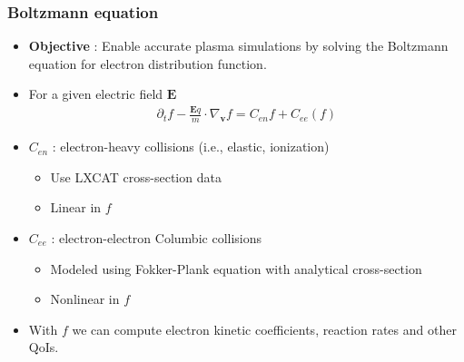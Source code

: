 \documentclass[mathserif, aspectratio=169]{beamer}
\newcommand{\vect}[1]{\boldsymbol{#1}}
\newcommand{\myint}{\int\limits}
\newcommand{\diff}[1]{\, d#1}
\begin{document}
\begin{frame}
	\frametitle{Boltzmann equation}
	\begin{itemize}
		\item \textbf{Objective} : Enable accurate plasma simulations by solving the Boltzmann equation for electron distribution function.
		\item For a given electric field $\vect{E}$
		\begin{align}
			\partial_t f -\frac{\vect{E} q}{m} \cdot \nabla_{\vect{v }}f = C_{en}f + C_{ee}(f)
		\end{align}
		\item $C_{en}$ : electron-heavy collisions (i.e., elastic, ionization)
		\begin{itemize}
			\item Use LXCAT cross-section data 
			\item Linear in $f$
		\end{itemize} 
		\item $C_{ee}$ : electron-electron Columbic collisions 
		\begin{itemize}
			\item Modeled using Fokker-Plank equation with analytical cross-section
			\item Nonlinear in $f$
		\end{itemize}
		\item With $f$ we can compute electron kinetic coefficients, reaction rates and other QoIs. 
	\end{itemize}
\end{frame}
\end{document}
